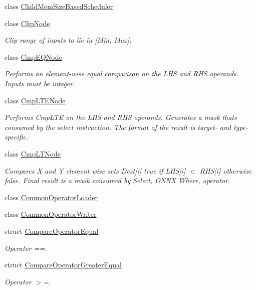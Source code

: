 \begin{DoxyCompactItemize}
class \hyperlink{classglow_1_1_child_mem_size_based_scheduler}{Child\+Mem\+Size\+Based\+Scheduler}
\item 
class \hyperlink{classglow_1_1_clip_node}{Clip\+Node}
\begin{DoxyCompactList}\small\item\em Clip range of inputs to lie in \mbox{[}Min, Max\mbox{]}. \end{DoxyCompactList}\item 
class \hyperlink{classglow_1_1_cmp_e_q_node}{Cmp\+E\+Q\+Node}
\begin{DoxyCompactList}\small\item\em Performs an element-\/wise equal comparison on the L\+HS and R\+HS operands. Inputs must be integer. \end{DoxyCompactList}\item 
class \hyperlink{classglow_1_1_cmp_l_t_e_node}{Cmp\+L\+T\+E\+Node}
\begin{DoxyCompactList}\small\item\em Performs Cmp\+L\+TE on the L\+HS and R\+HS operands. Generates a mask that\textquotesingle{}s consumed by the select instruction. The format of the result is target-\/ and type-\/specific. \end{DoxyCompactList}\item 
class \hyperlink{classglow_1_1_cmp_l_t_node}{Cmp\+L\+T\+Node}
\begin{DoxyCompactList}\small\item\em Compares X and Y element wise sets Dest\mbox{[}i\mbox{]} true if L\+HS\mbox{[}i\mbox{]} $<$ R\+HS\mbox{[}i\mbox{]} otherwise false. Final result is a mask consumed by Select, O\+N\+NX Where, operator. \end{DoxyCompactList}\item 
class \hyperlink{classglow_1_1_common_operator_loader}{Common\+Operator\+Loader}
\item 
class \hyperlink{classglow_1_1_common_operator_writer}{Common\+Operator\+Writer}
\item 
struct \hyperlink{structglow_1_1_compare_operator_equal}{Compare\+Operator\+Equal}
\begin{DoxyCompactList}\small\item\em Operator ==. \end{DoxyCompactList}\item 
struct \hyperlink{structglow_1_1_compare_operator_greater_equal}{Compare\+Operator\+Greater\+Equal}
\begin{DoxyCompactList}\small\item\em Operator $>$=. \end{DoxyCompactList}\item 

\end{DoxyCompactItemize}
